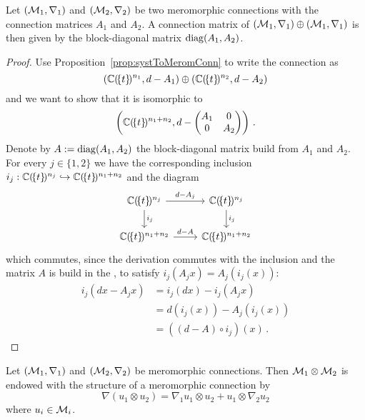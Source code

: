 \begin{prop}\label{prop:MatOfSumOfMerCon}
  Let $(\mathcal{M}_1,\nabla_1)$ and $(\mathcal{M}_2,\nabla_2)$ be two meromorphic
  connections
  with the connection matrices $A_1$ and $A_2$.
  A connection matrix of $(\mathcal{M}_1,\nabla_1)\oplus(\mathcal{M}_1,\nabla_1)$ is then
  given
  by the block-diagonal matrix $\operatorname{diag}(A_1,A_2)$.
\end{prop}
\begin{proof}
  Use Proposition~\ref{prop:systToMeromConn} to write the connection as
  \[
    (\mathbb{C}(\!\{t\}\!)^{n_1},d-A_1)\oplus(\mathbb{C}(\!\{t\}\!)^{n_2},d-A_2)
  \]
  and we want to show that it is isomorphic to
  \[
    \left(\mathbb{C}(\!\{t\}\!)^{n_1+n_2},d-
    \begin{pmatrix} A_1 & 0 \\0 & A_2 \end{pmatrix}\right) \,.
  \]
  Denote by $A:=\operatorname{diag}(A_1,A_2)$ the block-diagonal matrix build from $A_1$ and
  $A_2$.
  For every $j\in\{1,2\}$ we have the corresponding inclusion
  $i_j:\mathbb{C}(\!\{t\}\!)^{n_j}\hookrightarrow\mathbb{C}(\!\{t\}\!)^{n_1+n_2}$ and the
  diagram
  \[ \begin{tikzcd}
      \C(\!\{t\}\!)^{n_j} \rar{d-A_j}\dar{i_j} & \C(\!\{t\}\!)^{n_j} \dar{i_j}
    \\\C(\!\{t\}\!)^{n_1+n_2} \rar{d-A} & \C(\!\{t\}\!)^{n_1+n_2}
  \end{tikzcd} \]
  which commutes, since the derivation commutes with the inclusion and the
  matrix $A$ is build in the , to satisfy
  $i_j(A_jx)=A_j(i_j(x))$:
  \begin{align*}
    i_j(dx-A_jx) &= i_j(dx)-i_j(A_jx)
    \\&=d(i_j(x))-A_j(i_j(x))
    \\&=((d-A)\circ i_j)(x) \,.
  \end{align*}
\end{proof}

\begin{rem}
  Let $(\mathcal{M}_1,\nabla_1)$ and $(\mathcal{M}_2,\nabla_2)$ be meromorphic connections.
  Then $\mathcal{M}_1\otimes\mathcal{M}_2$ is endowed with the structure of a meromorphic
  connection by
  \[
  \nabla(u_1\otimes u_2)=\nabla_1u_1\otimes u_2+u_1\otimes\nabla_2u_2
  \]
  where $u_i\in\mathcal{M}_i$.
  \begin{comment}
    $\Hom_{\C(\!\{t\}\!)}(\cM_1,\cM_2)$ is endowed with the structure of a
    meromorphic connection by
    \[
    (\nabla\phi)(u_1)=\nabla_2(\phi(u_1))-\phi(\nabla_1 u_1)
    \]
    where $\phi\in\Hom_{\C(\!\{t\}\!)}(\cM_1,\cM_2)$ and $u_i\in\cM_i$.
  \end{comment}
\end{rem}

